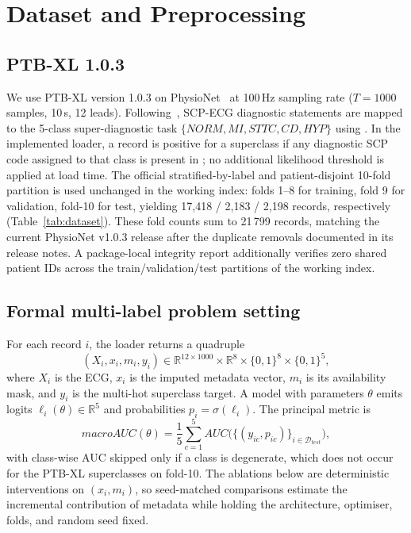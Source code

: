 \documentclass[mathematics,article,submit,pdftex]{Definitions/mdpi}
\def\mathrm#1{#1}%
\def\mathbf#1{#1}%
\def\bm#1{#1}%
\begin{document}
\section{Dataset and Preprocessing}\label{sec:dataset}

\subsection{PTB-XL 1.0.3}
We use PTB-XL version 1.0.3 on PhysioNet~\cite{Wagner2020,Goldberger2000} at 100\,Hz sampling rate ($T{=}1000$ samples, 10\,s, 12 leads). Following~\cite{Strodthoff2021}, SCP-ECG diagnostic statements are mapped to the 5-class super-diagnostic task $\{\mathrm{NORM}, \mathrm{MI}, \mathrm{STTC}, \mathrm{CD}, \mathrm{HYP}\}$ using . In the implemented loader, a record is positive for a superclass if any diagnostic SCP code assigned to that class is present in ; no additional likelihood threshold is applied at load time. The official stratified-by-label and patient-disjoint 10-fold partition is used unchanged in the working index: folds 1--8 for training, fold 9 for validation, fold-10 for test, yielding 17{,}418 / 2{,}183 / 2{,}198 records, respectively (Table~\ref{tab:dataset}). These fold counts sum to 21\,799 records, matching the current PhysioNet v1.0.3 release after the duplicate removals documented in its release notes. A package-local integrity report additionally verifies zero shared patient IDs across the train/validation/test partitions of the working index.

\subsection{Formal multi-label problem setting}
For each record $i$, the loader returns a quadruple
\[
(\mathbf{X}_i,\mathbf{x}_i,\mathbf{m}_i,\mathbf{y}_i)
\in \mathbb{R}^{12\times1000}\times\mathbb{R}^{8}\times\{0,1\}^{8}\times\{0,1\}^{5},
\]
where $\mathbf{X}_i$ is the ECG, $\mathbf{x}_i$ is the imputed metadata vector, $\mathbf{m}_i$ is its availability mask, and $\mathbf{y}_i$ is the multi-hot superclass target. A model with parameters $\theta$ emits logits $\bm{\ell}_{i}(\theta)\in\mathbb{R}^{5}$ and probabilities $\mathbf{p}_{i}=\sigma(\bm{\ell}_{i})$. The principal metric is
\[
\mathrm{macroAUC}(\theta)=\frac{1}{5}\sum_{c=1}^{5}\mathrm{AUC}\bigl(\{(y_{ic},p_{ic})\}_{i\in\mathcal{D}_{\mathrm{test}}}\bigr),
\]
with class-wise AUC skipped only if a class is degenerate, which does not occur for the PTB-XL superclasses on fold-10. The ablations below are deterministic interventions on $(\mathbf{x}_i,\mathbf{m}_i)$, so seed-matched comparisons estimate the incremental contribution of metadata while holding the architecture, optimiser, folds, and random seed fixed.
\end{document}
